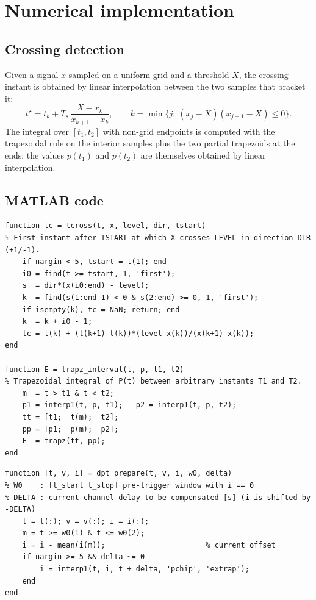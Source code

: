 \section{Numerical implementation}

\subsection{Crossing detection}

Given a signal $x$ sampled on a uniform grid and a threshold $X$, the crossing instant is
obtained by linear interpolation between the two samples that bracket it:
\begin{equation}
t^\star = t_k + T_s\,\frac{X-x_k}{x_{k+1}-x_k},\qquad
k=\min\{j:\ (x_j-X)(x_{j+1}-X)\le 0\}.
\end{equation}
The integral over $[t_1,t_2]$ with non-grid endpoints is computed with the trapezoidal
rule on the interior samples plus the two partial trapezoids at the ends; the values
$p(t_1)$ and $p(t_2)$ are themselves obtained by linear interpolation.

\subsection{MATLAB code}

\begin{lstlisting}[caption={Utility functions: threshold crossing and interpolated integral.}]
function tc = tcross(t, x, level, dir, tstart)
% First instant after TSTART at which X crosses LEVEL in direction DIR (+1/-1).
    if nargin < 5, tstart = t(1); end
    i0 = find(t >= tstart, 1, 'first');
    s  = dir*(x(i0:end) - level);
    k  = find(s(1:end-1) < 0 & s(2:end) >= 0, 1, 'first');
    if isempty(k), tc = NaN; return; end
    k  = k + i0 - 1;
    tc = t(k) + (t(k+1)-t(k))*(level-x(k))/(x(k+1)-x(k));
end

function E = trapz_interval(t, p, t1, t2)
% Trapezoidal integral of P(t) between arbitrary instants T1 and T2.
    m  = t > t1 & t < t2;
    p1 = interp1(t, p, t1);   p2 = interp1(t, p, t2);
    tt = [t1;  t(m);  t2];
    pp = [p1;  p(m);  p2];
    E  = trapz(tt, pp);
end
\end{lstlisting}

\begin{lstlisting}[caption={Pre-processing: offset removal and deskew.}]
function [t, v, i] = dpt_prepare(t, v, i, w0, delta)
% W0    : [t_start t_stop] pre-trigger window with i == 0
% DELTA : current-channel delay to be compensated [s] (i is shifted by -DELTA)
    t = t(:); v = v(:); i = i(:);
    m = t >= w0(1) & t <= w0(2);
    i = i - mean(i(m));                       % current offset
    if nargin >= 5 && delta ~= 0
        i = interp1(t, i, t + delta, 'pchip', 'extrap');
    end
end
\end{lstlisting}

